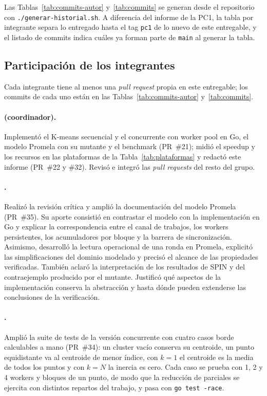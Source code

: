 Las Tablas~\ref{tab:commits-autor} y~\ref{tab:commits} se generan desde el repositorio con
\texttt{./generar-historial.sh}. A diferencia del informe de la PC1, la tabla por integrante separa
lo entregado hasta el tag \texttt{pc1} de lo nuevo de este entregable, y el listado de commits
indica cuáles ya forman parte de \texttt{main} al generar la tabla.



\subsection{Participación de los integrantes}

Cada integrante tiene al menos una \emph{pull request} propia en este entregable; los commits de cada
uno están en las Tablas~\ref{tab:commits-autor} y~\ref{tab:commits}.

\paragraph{\nombreRody{} (coordinador).} Implementó el K-means secuencial y el concurrente con worker
pool en Go, el modelo Promela con su mutante y el benchmark (PR~\#21); midió el speedup y los
recursos en las plataformas de la Tabla~\ref{tab:plataformas} y redactó este informe (PR~\#22 y
\#32). Revisó e integró las \emph{pull requests} del resto del grupo.

\paragraph{\nombreDayana.} Realizó la revisión crítica y amplió la documentación del modelo Promela
(PR~\#35). Su aporte consistió en contrastar el modelo con la implementación en Go y explicar la
correspondencia entre el canal de trabajos, los workers persistentes, los acumuladores por bloque y
la barrera de sincronización. Asimismo, desarrolló la lectura operacional de una ronda en Promela,
explicitó las simplificaciones del dominio modelado y precisó el alcance de las propiedades
verificadas. También aclaró la interpretación de los resultados de SPIN y del contraejemplo
producido por el mutante. Justificó qué aspectos de la implementación conserva la abstracción y
hasta dónde pueden extenderse las conclusiones de la verificación.

\paragraph{\nombreTercero.} Amplió la suite de tests de la versión concurrente con cuatro casos
borde calculables a mano (PR~\#34): un cluster vacío conserva su centroide, un punto equidistante va
al centroide de menor índice, con $k=1$ el centroide es la media de todos los puntos y con $k=N$ la
inercia es cero. Cada caso se prueba con 1, 2 y 4 workers y bloques de un punto, de modo que la
reducción de parciales se ejercita con distintos repartos del trabajo, y pasa con
\texttt{go test -race}.
